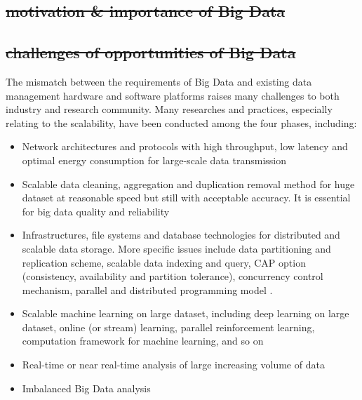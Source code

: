 \documentclass[conference]{IEEEtran}
\providecommand{\tightlist}{%
  \setlength{\itemsep}{0pt}\setlength{\parskip}{0pt}
}
\begin{document}
\hypertarget{motivation-importance-of-big-data}{%
\subsection{\texorpdfstring{\sout{motivation \& importance of Big
Data}}{motivation \& importance of Big Data}}\label{motivation-importance-of-big-data}}

\hypertarget{challenges-of-opportunities-of-big-data}{%
\subsection{\texorpdfstring{\sout{challenges of opportunities of Big
Data}}{challenges of opportunities of Big Data}}\label{challenges-of-opportunities-of-big-data}}

The mismatch between the requirements of Big Data and existing data
management hardware and software platforms raises many challenges to
both industry and research community. Many researches and practices,
especially relating to the scalability, have been conducted among the
four phases, including:

\begin{itemize}
\tightlist
\item
  Network architectures and protocols with high throughput, low latency
  and optimal energy consumption for large-scale data transmission
  \autocite{hu2014}
\item
  Scalable data cleaning, aggregation and duplication removal method for
  huge dataset at reasonable speed but still with acceptable accuracy.
  It is essential for big data quality and reliability
  \autocite{hu2014,OUSSOUS2018431}
\item
  Infrastructures, file systems and database technologies for
  distributed and scalable data storage. More specific issues include
  data partitioning and replication scheme, scalable data indexing and
  query, CAP option (consistency, availability and partition tolerance),
  concurrency control mechanism, parallel and distributed programming
  model \autocite{hu2014,Gupta2016}.
\item
  Scalable machine learning on large dataset, including deep learning on
  large dataset, online (or stream) learning, parallel reinforcement
  learning, computation framework for machine learning, and so on
  \autocite{OUSSOUS2018431,Gupta2016}
\item
  Real-time or near real-time analysis of large increasing volume of
  data \autocite{OUSSOUS2018431}
\item
  Imbalanced Big Data analysis \autocite{OUSSOUS2018431}
\end{itemize}
\end{document}
